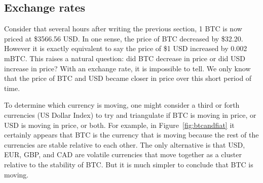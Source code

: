 \subsection{Exchange rates}
\label{app:xchange}

Consider that several hours after writing the previous section, 1 BTC is now priced at \$3566.56 USD. In one sense, the price of BTC decreased by \$32.20. However it is exactly equivalent to say the price of \$1 USD increased by 0.002 mBTC. This raises a natural question: did BTC decrease in price or did USD increase in price? With an exchange rate, it is impossible to tell. We only know that the price of BTC and USD became closer in price over this short period of time.

To determine which currency is moving, one might consider a third or forth currencies (\cf US Dollar Index) to try and triangulate if BTC is moving in price, or USD is moving in price, or both. For example, in Figure~\ref{fig:btcandfiat} it certainly appears that BTC is the currency that is moving because the rest of the currencies are stable relative to each other. The only alternative is that USD, EUR, GBP, and CAD are volatile currencies that move together as a cluster relative to the stability of BTC. But it is much simpler to conclude that BTC is moving.

